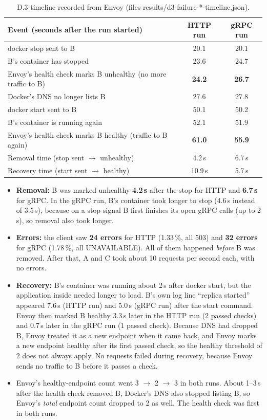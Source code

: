 \documentclass[10pt,a4paper]{article}
\newcommand{\codeus}{\textunderscore\allowbreak}
\newcommand{\code}[1]{{\small\ttfamily\let\_\codeus #1}}
\begin{document}
\begin{table}[H]
\centering\small
\begin{tabular}{@{}l c c@{}}
\toprule
Event (seconds after the run started) & HTTP run & gRPC run \\
\midrule
\code{docker stop} sent to B & 20.1 & 20.1 \\
B's container has stopped & 23.6 & 24.7 \\
Envoy's health check marks B unhealthy (no more traffic to B) & \textbf{24.2} & \textbf{26.7} \\
Docker's DNS no longer lists B & 27.6 & 27.8 \\
\code{docker start} sent to B & 50.1 & 50.2 \\
B's container is running again & 52.1 & 51.9 \\
Envoy's health check marks B healthy (traffic to B again) & \textbf{61.0} & \textbf{55.9} \\
\midrule
Removal time (stop sent $\to$ unhealthy) & 4.2\,s & 6.7\,s \\
Recovery time (start sent $\to$ healthy) & 10.9\,s & 5.7\,s \\
\bottomrule
\end{tabular}
\caption{D.3 timeline recorded from Envoy (files \code{results/d3-failure-*-timeline.json}).}
\label{tab:timeline}
\end{table}

\begin{itemize}
\item \textbf{Removal:} B was marked unhealthy \textbf{4.2\,s} after the stop for HTTP and \textbf{6.7\,s} for gRPC.
In the gRPC run, B's container took longer to stop (4.6\,s instead of 3.5\,s), because on a stop signal B first
finishes its open gRPC calls (up to 2\,s), so removal also took longer.
\item \textbf{Errors:} the client saw \textbf{24 errors} for HTTP (1.33\,\%, all \code{503}) and \textbf{32 errors}
for gRPC (1.78\,\%, all \code{UNAVAILABLE}). All of them happened \emph{before} B was removed. After that, A and C
took about 10 requests per second each, with no errors.
\item \textbf{Recovery:} B's container was running about 2\,s after \code{docker start}, but the application inside
needed longer to load. B's own log line ``replica started'' appeared 7.6\,s (HTTP run) and 5.0\,s (gRPC run) after the
start command. Envoy then marked B healthy 3.3\,s later in the HTTP run (2 passed checks) and 0.7\,s later in the gRPC
run (1 passed check). Because DNS had dropped B, Envoy treated it as a new endpoint when it came back, and Envoy marks
a new endpoint healthy after its first passed check, so the healthy threshold of 2 does not always apply. No
requests failed during recovery, because Envoy sends no traffic to B before it passes a check.
\item Envoy's healthy-endpoint count went 3 $\to$ 2 $\to$ 3 in both runs. About 1--3\,s after the health check removed
B, Docker's DNS also stopped listing B, so Envoy's \emph{total} endpoint count dropped to 2 as well. The health check
was first in both runs.
\end{itemize}
\end{document}
